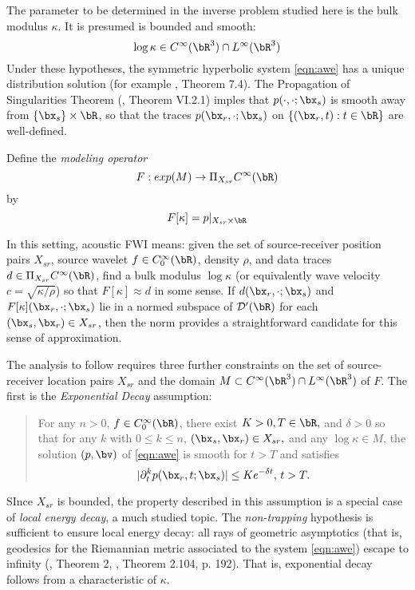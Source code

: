 The parameter to be determined in the inverse problem studied here is
the bulk modulus $\kappa$. It is presumed is bounded and smooth:
\begin{equation}
  \label{eqn:coeff}
  \log \kappa \in C^{\infty}(\bR^3) \cap L^{\infty}(\bR^3)
\end{equation}
Under these hypotheses, the symmetric hyperbolic system \ref{eqn:awe}
has a unique distribution solution (for example \cite{Lax:PDENotes},
Theorem 7.4). The Propagation of
Singularities Theorem (\cite{Tay:81}, Theorem VI.2.1) %
imples that $p(\cdot,\cdot;\bx_s)$ is smooth away from $\{\bx_s\}
\times \bR$, so that the traces $p(\bx_r, \cdot;\bx_s)$ on
$\{(\bx_r,t): t \in \bR\}$ are well-defined.

Define the {\em modeling operator}
\begin{equation}
  \label{eqn:modop}
  F: exp(M)  \rightarrow \Pi_{X_{sr}} C^{\infty}(\bR)
\end{equation}
by
\begin{equation}
  \label{eqn:modopdef}
  F[\kappa]= p|_{X_{sr} \times \bR}
\end{equation}

In this setting, acoustic FWI means: given the set of
source-receiver position pairs $X_{sr}$, source wavelet
$f \in C_0^{\infty}(\bR)$,  density $\rho$, and data traces
$d \in \Pi_{X_{sr}} C^{\infty}(\bR)$, find a bulk modulus $\log
\kappa$
(or equivalently wave velocity $c=\sqrt{\kappa/\rho}$)
so that $F[\kappa] \approx d$ in some sense. If
$d(\bx_r,\cdot;\bx_s)$ and $F[\kappa](\bx_r,\cdot;\bx_s)$ lie in a normed subspace of ${\cal D}'(\bR)$ for each
$(\bx_s,\bx_r) \in X_{sr}$, then the
norm provides a straightforward candidate for this sense of
approximation.

The analysis to follow requires three further constraints on the set
of source-receiver location pairs $X_{sr}$ and the domain
$M \subset C^{\infty}(\bR^3) \cap L^{\infty}(\bR^3)$ of $F$. The first is
the {\em Exponential Decay} assumption:
\begin{quote}
  For any $n > 0$, $f \in C_0^{\infty}(\bR)$,
  there exist $K >
  0, T \in \bR,$ and $\delta>0$ so
  that for any $k$ with $0 \le k \le n$, $(\bx_s,\bx_r) \in
 X_{sr},$ and any $\log \kappa \in M$, the solution $(p,\bv)$ of \ref{eqn:awe} is smooth
  for $t>T$ and satisfies
  \[
    |\partial_t^k p(\bx_r,t;\bx_s)| \le K e^{-\delta t}, \, t > T.
  \]
\end{quote}
SInce $X_{sr}$ is bounded, the property described in this assumption
is a special case of {\em local energy decay}, a much studied topic. The {\em
  non-trapping} hypothesis is sufficient to ensure local energy decay:
all rays of geometric asymptotics (that is, geodesics for the Riemannian metric associated
to the system \ref{eqn:awe}) escape to infinity (\cite{Hristova:09},
Theorem 2, \cite{EgorovShubin}, Theorem 2.104, p. 192). That is,
exponential decay follows from a characteristic of $\kappa$.

